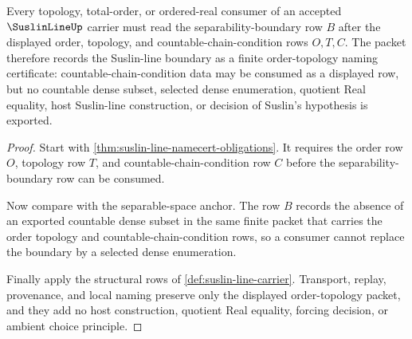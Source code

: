 \begin{theorem}
\label{thm:suslin-line-separability-boundary}
Every topology, total-order, or ordered-real consumer of an accepted $\SuslinLineUp$ carrier must read the separability-boundary row $B$ after the displayed order, topology, and countable-chain-condition rows $O,T,C$. The packet therefore records the Suslin-line boundary as a finite order-topology naming certificate: countable-chain-condition data may be consumed as a displayed row, but no countable dense subset, selected dense enumeration, quotient Real equality, host Suslin-line construction, or decision of Suslin's hypothesis is exported.
\end{theorem}
\begin{proof}
Start with \autoref{thm:suslin-line-namecert-obligations}. It requires the order row $O$, topology row $T$, and countable-chain-condition row $C$ before the separability-boundary row can be consumed.

Now compare with the separable-space anchor. The row $B$ records the absence of an exported countable dense subset in the same finite packet that carries the order topology and countable-chain-condition rows, so a consumer cannot replace the boundary by a selected dense enumeration.

Finally apply the structural rows of \autoref{def:suslin-line-carrier}. Transport, replay, provenance, and local naming preserve only the displayed order-topology packet, and they add no host construction, quotient Real equality, forcing decision, or ambient choice principle.
\end{proof}




